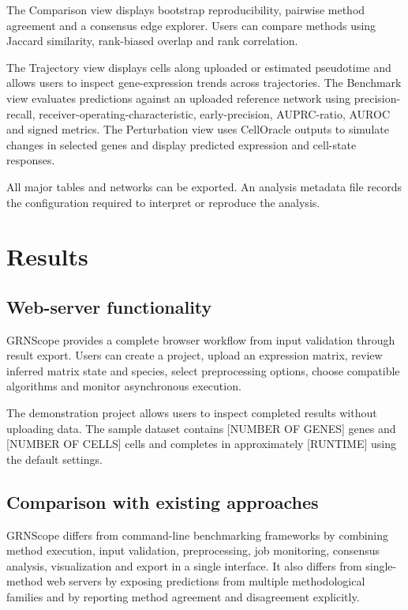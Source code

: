 \documentclass[unnumsec,webpdf,modern,large]{oup-authoring-template}%
\begin{document}
The Comparison view displays bootstrap reproducibility, pairwise method agreement and a consensus edge explorer. Users can compare methods using Jaccard similarity, rank-biased overlap and rank correlation.

The Trajectory view displays cells along uploaded or estimated pseudotime and allows users to inspect gene-expression trends across trajectories. The Benchmark view evaluates predictions against an uploaded reference network using precision-recall, receiver-operating-characteristic, early-precision, AUPRC-ratio, AUROC and signed metrics. The Perturbation view uses CellOracle outputs to simulate changes in selected genes and display predicted expression and cell-state responses.

All major tables and networks can be exported. An analysis metadata file records the configuration required to interpret or reproduce the analysis.

\section{Results}

\subsection{Web-server functionality}

GRNScope provides a complete browser workflow from input validation through result export. Users can create a project, upload an expression matrix, review inferred matrix state and species, select preprocessing options, choose compatible algorithms and monitor asynchronous execution.

The demonstration project allows users to inspect completed results without uploading data. The sample dataset contains [NUMBER OF GENES] genes and [NUMBER OF CELLS] cells and completes in approximately [RUNTIME] using the default settings.

\subsection{Comparison with existing approaches}

GRNScope differs from command-line benchmarking frameworks by combining method execution, input validation, preprocessing, job monitoring, consensus analysis, visualization and export in a single interface. It also differs from single-method web servers by exposing predictions from multiple methodological families and by reporting method agreement and disagreement explicitly.
\end{document}
